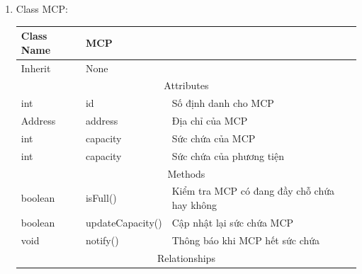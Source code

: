 \begin{enumerate}
        \newpage
        \item Class MCP:
        \begin{table}[htp]
            \begin{tabular}{|lll|}
                \hline
                \multicolumn{1}{|l|}{Class Name} & \multicolumn{2}{l|}{MCP}                                                            \\ \hline
                \multicolumn{1}{|l|}{Inherit}    & \multicolumn{2}{l|}{None}                                                           \\ \hline
                \multicolumn{3}{|c|}{\cellcolor[HTML]{FFFFC7}Attributes}                                                               \\ \hline
                \multicolumn{1}{|l|}{int}        & \multicolumn{1}{l|}{id}               & Số định danh cho MCP                        \\ \hline
                \multicolumn{1}{|l|}{Address}    & \multicolumn{1}{l|}{address}          & Địa chỉ của MCP                             \\ \hline
                \multicolumn{1}{|l|}{int}        & \multicolumn{1}{l|}{capacity}         & Sức chứa của MCP                            \\ \hline
                \multicolumn{1}{|l|}{int}        & \multicolumn{1}{l|}{capacity}         & Sức chứa của phương tiện                    \\ \hline
                \multicolumn{3}{|c|}{\cellcolor[HTML]{FFFFC7}Methods}                                                                  \\ \hline
                \multicolumn{1}{|l|}{boolean}    & \multicolumn{1}{l|}{isFull()}         & Kiểm tra MCP có đang đầy chỗ chứa hay không \\ \hline
                \multicolumn{1}{|l|}{boolean}    & \multicolumn{1}{l|}{updateCapacity()} & Cập nhật lại sức chứa MCP                   \\ \hline
                \multicolumn{1}{|l|}{void}       & \multicolumn{1}{l|}{notify()}         & Thông báo khi MCP hết sức chứa              \\ \hline
                \multicolumn{3}{|c|}{\cellcolor[HTML]{FFFFC7}Relationships}                                                            \\ \hline
            \end{tabular}
        \end{table}
\end{enumerate}